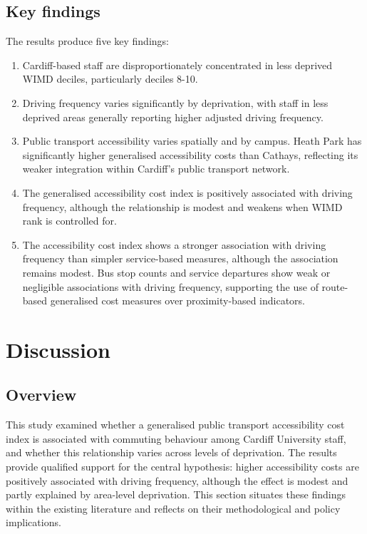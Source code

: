 \documentclass[11pt,a4paper]{article}
\begin{document}
\subsection{Key findings}

The results produce five key findings:

\begin{enumerate}
    \item Cardiff-based staff are disproportionately concentrated in less deprived WIMD deciles, particularly deciles 8-10.
    \item Driving frequency varies significantly by deprivation, with staff in less deprived areas generally reporting higher adjusted driving frequency.
    \item Public transport accessibility varies spatially and by campus. Heath Park has significantly higher generalised accessibility costs than Cathays, reflecting its weaker integration within Cardiff's public transport network.
    \item The generalised accessibility cost index is positively associated with driving frequency, although the relationship is modest and weakens when WIMD rank is controlled for.
    \item The accessibility cost index shows a stronger association with driving frequency than simpler service-based measures, although the association remains modest. Bus stop counts and service departures show weak or negligible associations with driving frequency, supporting the use of route-based generalised cost measures over proximity-based indicators.
\end{enumerate}

\section{Discussion}

\subsection{Overview}

This study examined whether a generalised public transport accessibility cost index is associated with commuting behaviour among Cardiff University staff, and whether this relationship varies across levels of deprivation. The results provide qualified support for the central hypothesis: higher accessibility costs are positively associated with driving frequency, although the effect is modest and partly explained by area-level deprivation. This section situates these findings within the existing literature and reflects on their methodological and policy implications.
\end{document}
